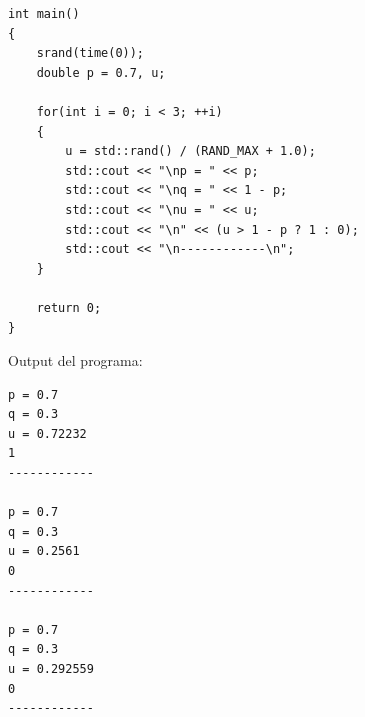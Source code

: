 \documentclass[a4paper, 12pt]{article}
\begin{document}
\begin{enumerate}
{\begin{lstlisting}
int main()
{
    srand(time(0));
    double p = 0.7, u;

    for(int i = 0; i < 3; ++i)
    {
        u = std::rand() / (RAND_MAX + 1.0);
        std::cout << "\np = " << p;
        std::cout << "\nq = " << 1 - p;
        std::cout << "\nu = " << u;
        std::cout << "\n" << (u > 1 - p ? 1 : 0);
        std::cout << "\n------------\n";
    }

    return 0;
}
                \end{lstlisting}
                \Large Output del programa:
                \begin{lstlisting}
p = 0.7
q = 0.3
u = 0.72232
1
------------

p = 0.7
q = 0.3
u = 0.2561
0
------------

p = 0.7
q = 0.3
u = 0.292559
0
------------
               \end{lstlisting}
            }
    \end{enumerate}
\end{document}
